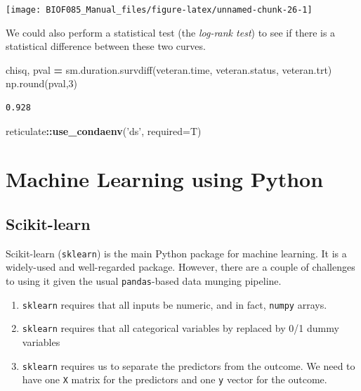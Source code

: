 \documentclass[
  letterpaper,
]{scrbook}
\newenvironment{Shaded}{\begin{snugshade}}{\end{snugshade}}
\newcommand{\BuiltInTok}[1]{#1}
\newcommand{\DataTypeTok}[1]{\textcolor[rgb]{0.13,0.29,0.53}{#1}}
\newcommand{\DecValTok}[1]{\textcolor[rgb]{0.00,0.00,0.81}{#1}}
\newcommand{\KeywordTok}[1]{\textcolor[rgb]{0.13,0.29,0.53}{\textbf{#1}}}
\newcommand{\NormalTok}[1]{#1}
\newcommand{\OperatorTok}[1]{\textcolor[rgb]{0.81,0.36,0.00}{\textbf{#1}}}
\newcommand{\StringTok}[1]{\textcolor[rgb]{0.31,0.60,0.02}{#1}}
\providecommand{\tightlist}{%
  \setlength{\itemsep}{0pt}\setlength{\parskip}{0pt}}
\begin{document}
\begin{center}\texttt{[image: BIOF085\_Manual\_files/figure-latex/unnamed-chunk-26-1]} \end{center}

We could also perform a statistical test (the \emph{log-rank test}) to see
if there is a statistical difference between these two curves.

\begin{Shaded}
\begin{Highlighting}[]
\NormalTok{chisq, pval }\OperatorTok{=}\NormalTok{ sm.duration.survdiff(veteran.time, veteran.status, veteran.trt)}
\NormalTok{np.}\BuiltInTok{round}\NormalTok{(pval,}\DecValTok{3}\NormalTok{)}
\end{Highlighting}
\end{Shaded}

\begin{verbatim}
0.928
\end{verbatim}

\begin{Shaded}
\begin{Highlighting}[]
\NormalTok{reticulate}\OperatorTok{::}\KeywordTok{use_condaenv}\NormalTok{(}\StringTok{'ds'}\NormalTok{, }\DataTypeTok{required=}\NormalTok{T)}
\end{Highlighting}
\end{Shaded}

\hypertarget{machine-learning-using-python}{%
\chapter{Machine Learning using Python}\label{machine-learning-using-python}}

\hypertarget{scikit-learn}{%
\section{Scikit-learn}\label{scikit-learn}}

Scikit-learn (\texttt{sklearn}) is the main Python package for machine learning. It is a widely-used and well-regarded package. However, there are a couple of challenges to using it given the usual \texttt{pandas}-based data munging pipeline.

\begin{enumerate}
\def\labelenumi{\arabic{enumi}.}
\tightlist
\item
  \texttt{sklearn} requires that all inputs be numeric, and in fact, \texttt{numpy} arrays.
\item
  \texttt{sklearn} requires that all categorical variables by replaced by 0/1 dummy variables
\item
  \texttt{sklearn} requires us to separate the predictors from the outcome. We need to have one \texttt{X} matrix for the predictors and one \texttt{y} vector for the outcome.
\end{enumerate}
\end{document}
